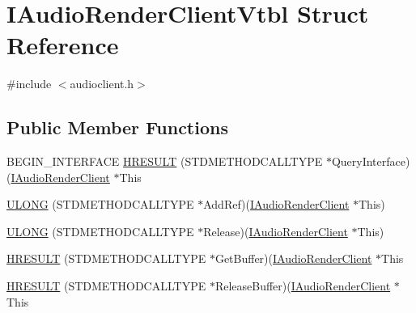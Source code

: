 \hypertarget{struct_i_audio_render_client_vtbl}{}\section{I\+Audio\+Render\+Client\+Vtbl Struct Reference}
\label{struct_i_audio_render_client_vtbl}


{\ttfamily \#include $<$audioclient.\+h$>$}

\subsection*{Public Member Functions}
\begin{DoxyCompactItemize}
\item 
B\+E\+G\+I\+N\+\_\+\+I\+N\+T\+E\+R\+F\+A\+CE \hyperlink{struct_i_audio_render_client_vtbl_a1fb875cbc5833a455aa8c3e6f91b0517}{H\+R\+E\+S\+U\+LT} (S\+T\+D\+M\+E\+T\+H\+O\+D\+C\+A\+L\+L\+T\+Y\+PE $\ast$Query\+Interface)(\hyperlink{audioclient_8h_a3d3202e827ce9328a16178551d97746e}{I\+Audio\+Render\+Client} $\ast$This
\item 
\hyperlink{struct_i_audio_render_client_vtbl_ab0cc62fc14ba2f1c6e75bbcae56d91cf}{U\+L\+O\+NG} (S\+T\+D\+M\+E\+T\+H\+O\+D\+C\+A\+L\+L\+T\+Y\+PE $\ast$Add\+Ref)(\hyperlink{audioclient_8h_a3d3202e827ce9328a16178551d97746e}{I\+Audio\+Render\+Client} $\ast$This)
\item 
\hyperlink{struct_i_audio_render_client_vtbl_a816988b04683d8b66ff423347ebfcc23}{U\+L\+O\+NG} (S\+T\+D\+M\+E\+T\+H\+O\+D\+C\+A\+L\+L\+T\+Y\+PE $\ast$Release)(\hyperlink{audioclient_8h_a3d3202e827ce9328a16178551d97746e}{I\+Audio\+Render\+Client} $\ast$This)
\item 
\hyperlink{struct_i_audio_render_client_vtbl_aae6897ef098dbd4d15323bc03aa1f7f1}{H\+R\+E\+S\+U\+LT} (S\+T\+D\+M\+E\+T\+H\+O\+D\+C\+A\+L\+L\+T\+Y\+PE $\ast$Get\+Buffer)(\hyperlink{audioclient_8h_a3d3202e827ce9328a16178551d97746e}{I\+Audio\+Render\+Client} $\ast$This
\item 
\hyperlink{struct_i_audio_render_client_vtbl_a1e3abdcefdcbb085a56f852c56d7d869}{H\+R\+E\+S\+U\+LT} (S\+T\+D\+M\+E\+T\+H\+O\+D\+C\+A\+L\+L\+T\+Y\+PE $\ast$Release\+Buffer)(\hyperlink{audioclient_8h_a3d3202e827ce9328a16178551d97746e}{I\+Audio\+Render\+Client} $\ast$This
\end{DoxyCompactItemize}
